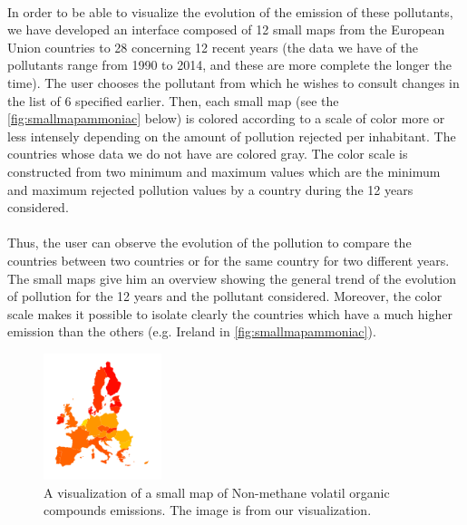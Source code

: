 \documentclass[preprint,journal]{vgtc}       %
\begin{document}
\paragraph{}
In order to be able to visualize the evolution of the emission of these pollutants, we have developed an interface composed of 12 small maps from the European Union countries to 28 concerning 12 recent years (the data we have of the pollutants range from 1990 to 2014, and these are more complete the longer the time). The user chooses the pollutant from which he wishes to consult changes in the list of 6 specified earlier. Then, each small map (see the \autoref{fig:smallmapammoniac} below) is colored according to a scale of color more or less intensely depending on the amount of pollution rejected per inhabitant. The countries whose data we do not have are colored gray. The color scale is constructed from two minimum and maximum values ​​which are the minimum and maximum rejected pollution values ​​by a country during the 12 years considered.

\paragraph{}
Thus, the user can observe the evolution of the pollution to compare the countries between two countries or for the same country for two different years. The small maps give him an overview showing the general trend of the evolution of pollution for the 12 years and the pollutant considered. Moreover, the color scale makes it possible to isolate clearly the countries which have a much higher emission than the others (e.g. Ireland in \autoref{fig:smallmapammoniac}).

\begin{figure}[H]
 \centering %
 \includegraphics[width=130px]{smallmap2}
 \caption{A visualization of a small map of Non-methane volatil organic compounds emissions. The image is from our visualization.}
 \label{fig:smallmapammoniac}
\end{figure}
\end{document}
